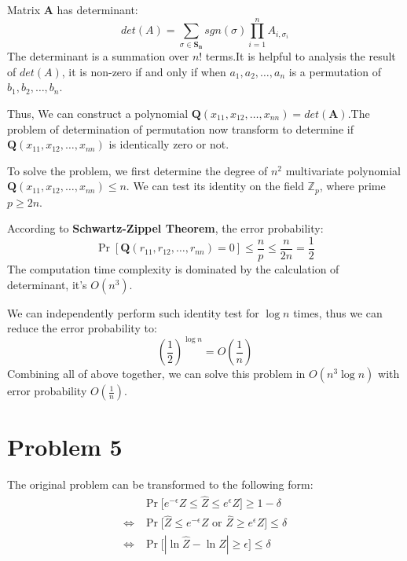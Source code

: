 \documentclass[a4paper, 12pt, titlepage]{article}
\begin{document}
Matrix \textbf{A} has determinant: 
\[
    det(A) = \sum_{\sigma \in \mathbf{S_{n}}} sgn(\sigma) \prod_{i = 1}^{n} A_{i, \sigma_{i}}
\]
The determinant is a summation over $n!$ terms.It is helpful to analysis the result of $det(A)$, 
it is non-zero if and only if when $a_{1}, a_{2}, \ldots, a_{n}$ is a permutation of $b_{1}, b_{2}, \ldots, b_{n}$. 

Thus, We can construct a polynomial $\mathbf{Q}(x_{11}, x_{12}, \ldots, x_{nn}) = det(\mathbf{A})$.The problem of determination of
permutation now transform to determine if $\mathbf{Q}(x_{11}, x_{12}, \ldots, x_{nn})$ is identically zero or not.

To solve the problem, we first determine the degree of $n^2$ multivariate polynomial $\mathbf{Q}(x_{11}, x_{12}, \ldots, x_{nn}) \leq n$.
We can test its identity on the field $\mathbb{Z}_{p}$, where prime $p \geq 2n$.

According to \textbf{Schwartz-Zippel Theorem}, the error probability:
\[
    \Pr \left[ \mathbf{Q}(r_{11}, r_{12}, \ldots, r_{nn}) = 0 \right] \leq \frac{n}{p} \leq \frac{n}{2n} = \frac{1}{2}
\]             
The computation time complexity is dominated by the calculation of determinant, it's $O\left( n^{3} \right)$.

We can independently perform such identity test for $\log{n}$ times, thus we can reduce the error probability to:
\[
    \left( \frac{1}{2} \right)^{\log{n}} = O \left( \frac{1}{n} \right)
\]
Combining all of above together, we can solve this problem in $O \left( n^{3} \log{n} \right)$ with error probability $O \left( \frac{1}{n} \right)$.

\section{Problem 5}
The original problem can be transformed to the following form: 
\begin{equation}
    \begin{aligned}
        &\Pr \bigg[ e^{-\epsilon} Z \leq \hat{Z} \leq e^{\epsilon} Z \bigg] \geq 1 - \delta \\
        \Longleftrightarrow &\Pr \bigg[ \hat{Z} \leq e^{-\epsilon} Z \text{\ or \ }  \hat{Z} \geq e^{\epsilon} Z \bigg] \leq \delta \\
        \Longleftrightarrow &\Pr \bigg[ |\ln{\hat{Z}} - \ln{Z}| \geq \epsilon \bigg] \leq \delta \\
    \end{aligned}
\end{equation}
\end{document}
